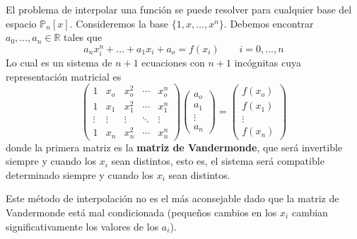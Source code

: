         \begin{obs}
        El problema de interpolar una función se puede resolver para cualquier base del espacio $\mathbb{P}_n[x]$.  Consideremos la base $\{1, x,\ldots, x^n\}$. Debemos encontrar $a_0,\ldots,a_n\in\mathbb{R}$ tales que
        $$a_nx_i^n+\ldots+a_1x_i+a_o=f(x_i)\qquad i=0,\ldots, n$$
        Lo cual es un sistema de $n+1$ ecuaciones con $n+1$ incógnitas cuya representación matricial es
        $$
        \left(\begin{array}{ccccc}
            1 &x_o&x_o^2&\cdots &x_o^n  \\
            1 &x_1&x_1^2&\cdots &x_1^n \\
            \vdots &\vdots&\vdots&\ddots &\vdots\\
            1 &x_n&x_n^2&\cdots &x_n^n
        \end{array}\right)\left(\begin{array}{c}
             a_o  \\
             a_1\\
             \vdots\\
             a_n
        \end{array}\right)=\left(\begin{array}{c}
             f(x_o)  \\
             f(x_1)\\
             \vdots\\
             f(x_n)
        \end{array}\right)
        $$
        donde la primera matriz es la \textbf{matriz de Vandermonde}, que será invertible siempre y cuando los $x_i$ sean distintos, esto es, el sistema será compatible determinado siempre y cuando los $x_i$ sean distintos. 
        
        Este método de interpolación no es el más aconsejable dado que la matriz de Vandermonde está mal condicionada (pequeños cambios en los $x_i$ cambian significativamente los valores de los $a_i$).
        \end{obs}
